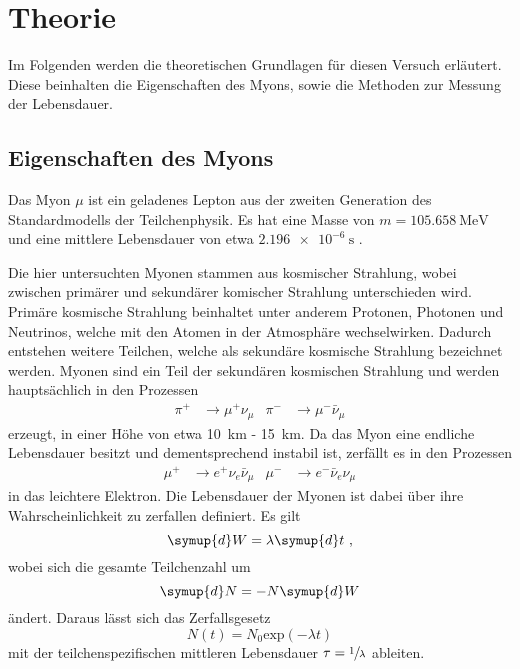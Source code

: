 \section{Theorie}
\label{sec:theorie}

Im Folgenden werden die theoretischen Grundlagen für diesen Versuch erläutert.
Diese beinhalten die Eigenschaften des Myons, 
sowie die Methoden zur Messung der Lebensdauer.

\subsection{Eigenschaften des Myons}

Das Myon $\mu$ ist ein geladenes Lepton aus der zweiten Generation des Standardmodells der Teilchenphysik.
Es hat eine Masse von $m = \SI{105.658}{\mega\eV}$ und eine mittlere Lebensdauer von etwa $\SI{2,196e-6}{\second}$ \cite{pdg}.

Die hier untersuchten Myonen stammen aus kosmischer Strahlung,
wobei zwischen primärer und sekundärer komischer Strahlung unterschieden wird.
Primäre kosmische Strahlung beinhaltet unter anderem Protonen, 
Photonen und Neutrinos,
welche mit den Atomen in der Atmosphäre wechselwirken.
Dadurch entstehen weitere Teilchen, 
welche als sekundäre kosmische Strahlung bezeichnet werden.
Myonen sind ein Teil der sekundären kosmischen Strahlung und werden hauptsächlich in den Prozessen
\begin{align*}
    \pi^{+} &\to \mu^{+} \nu_{\mu} & \pi^{-} &\to \mu^{-} \bar{\nu}_{\mu}
\end{align*}
erzeugt,
in einer Höhe von etwa \SI{10}{\kilo\meter} - \SI{15}{\kilo\meter}.
Da das Myon eine endliche Lebensdauer besitzt und dementsprechend instabil ist, 
zerfällt es in den Prozessen 
\begin{align*}
    \mu^{+} &\to e^{+} \nu_{e} \bar{\nu}_{\mu} & \mu^{-} &\to e^{-} \bar{\nu}_{e} \nu_{\mu}
\end{align*}
in das leichtere Elektron.
Die Lebensdauer der Myonen ist dabei über ihre Wahrscheinlichkeit zu zerfallen definiert.
Es gilt
\begin{equation*}
    \symup{d}W = \lambda \symup{d}t \ ,
\end{equation*}
wobei sich die gesamte Teilchenzahl um 
\begin{equation*}
    \symup{d}N = -N \symup{d}W
\end{equation*}
ändert.
Daraus lässt sich das Zerfallsgesetz
\begin{equation}
    N(t) = N_0 \text{exp}(- \lambda t)
\end{equation}
mit der teilchenspezifischen mittleren Lebensdauer $\tau = \sfrac{1}{\lambda}$ ableiten.


